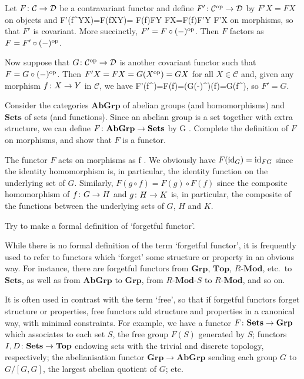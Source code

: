 Let $F\colon \mathcal{C}\to \mathcal{D}$ be a contravariant functor and define $F'\colon\mathcal{C}^{\mathrm{op}}\to\mathcal{D}$ by $F'X=FX$ on objects and
\bse
F'(f^\op\cl Y\to X)=F(f\cl X\to Y)= F(f)\cl FY \to FX=F(f)\cl F'Y \to F'X
\ese
on morphisms, so that $F'$ is covariant. More succinctly, $F'=F\circ(-)^{\mathrm{op}}$. Then $F$ factors as $F=F'\circ(-)^{\mathrm{op}}$.

Now suppose that $G\colon \mathcal{C}^{\mathrm{op}}\to\mathcal{D}$ is another covariant functor such that $F=G\circ(-)^{\mathrm{op}}$. Then $F'X=FX=G(X^{\mathrm{op}})=GX$ for all $X\in \mathcal{C}$ and, given any morphism $f\colon X\to Y$ in $\mathcal{C}$, we have
\bse
F'(f^\op)=F(f)=(G\circ(-)^\op)(f)=G(f^\op),
\ese
so $F'=G$.
\es

\bx
Consider the categories $\mathbf{AbGrp}$ of abelian groups (and homomorphisms) and $\mathbf{Sets}$ of sets (and functions). Since an abelian group is a set together with extra structure, we can define $F \colon \mathbf{AbGrp} \to\mathbf{Sets}$ by
\bse
G \longmapsto {}.
\ese
Complete the definition of $F$ on morphisms, and show that $F$ is a functor.
\ex

\bs
The functor $F$ acts on morphisms as
\bse
f \longmapsto {}.
\ese
We obviously have $F(\mathrm{id}_G)=\mathrm{id}_{FG}$ since the identity homomorphism is, in particular, the identity function on the underlying set of $G$. Similarly, $F(g\circ f)=F(g)\circ F(f)$ since the composite homomorphism of $f\colon G\to H$ and $g\colon H\to K$ is, in particular, the composite of the functions between the underlying sets of $G$, $H$ and $K$. 
\es

\bx
Try to make a formal definition of `forgetful functor'.
\ex

\bs
While there is no formal definition of the term `forgetful functor', it is frequently used to refer to functors which `forget' some structure or property in an obvious way. For instance, there are forgetful functors from $\mathbf{Grp}$, $\mathbf{Top}$, $R$-$\mathbf{Mod}$, etc.\ to $\mathbf{Sets}$, as well as from $\mathbf{AbGrp}$ to $\mathbf{Grp}$, from $R$-$\mathbf{Mod}$-$S$ to $R$-$\mathbf{Mod}$, and so on.

It is often used in contrast with the term `free', so that if forgetful functors forget structure or properties, free functors add structure and properties in a canonical way, with minimal constraints. For example, we have a functor $F\colon \mathbf{Sets}\to\mathbf{Grp}$ which associates to each set $S$, the free group $F(S)$ generated by $S$; functors $I,D\colon \mathbf{Sets}\to\mathbf{Top}$ endowing sets with the trivial and discrete topology, respectively; the abelianisation functor $\mathbf{Grp}\to\mathbf{AbGrp}$ sending each group $G$ to $G/[G,G]$, the largest abelian quotient of $G$; etc.
\es

